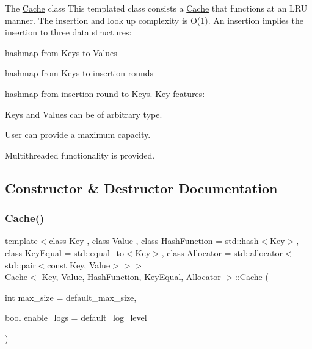 The \mbox{\hyperlink{class_cache}{Cache}} class This templated class consists a \mbox{\hyperlink{class_cache}{Cache}} that functions at an L\+RU manner. The insertion and look up complexity is O(1). An insertion implies the insertion to three data structures\+: 


\begin{DoxyEnumerate}
\item hashmap from Keys to Values
\item hashmap from Keys to insertion rounds
\item hashmap from insertion round to Keys. Key features\+:
\end{DoxyEnumerate}
\begin{DoxyEnumerate}
\item Keys and Values can be of arbitrary type.
\item User can provide a maximum capacity.
\item Multithreaded functionality is provided. 
\end{DoxyEnumerate}

\subsection{Constructor \& Destructor Documentation}
\mbox{\label{class_cache_a7b08c5e504d8421f25c9770fd9767bb9}} 
\subsubsection{\texorpdfstring{Cache()}{Cache()}}
{\footnotesize\ttfamily template$<$class Key , class Value , class Hash\+Function  = std\+::hash$<$\+Key$>$, class Key\+Equal  = std\+::equal\+\_\+to$<$\+Key$>$, class Allocator  = std\+::allocator$<$std\+::pair$<$const Key, Value$>$$>$$>$ \\
\mbox{\hyperlink{class_cache}{Cache}}$<$ Key, Value, Hash\+Function, Key\+Equal, Allocator $>$\+::\mbox{\hyperlink{class_cache}{Cache}} (\begin{DoxyParamCaption}\item[{int}]{max\+\_\+size = {\ttfamily default\+\_\+max\+\_\+size},  }\item[{bool}]{enable\+\_\+logs = {\ttfamily default\+\_\+log\+\_\+level} }\end{DoxyParamCaption})\hspace{0.3cm}{\ttfamily [inline]}}



